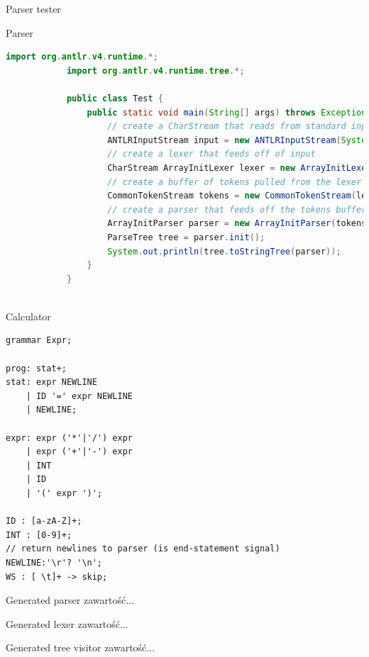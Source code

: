 \documentclass{beamer}
\begin{document}
\begin{frame}[fragile]{Parser tester}
	\begin{exampleblock}{Parser}
		\begin{lstlisting}[basicstyle=\tiny, language=Java]
			import org.antlr.v4.runtime.*;
			import org.antlr.v4.runtime.tree.*;
			
			public class Test { 
			    public static void main(String[] args) throws Exception { 
			        // create a CharStream that reads from standard input 
			        ANTLRInputStream input = new ANTLRInputStream(System.in);
			        // create a lexer that feeds off of input 
			        CharStream ArrayInitLexer lexer = new ArrayInitLexer(input);
			        // create a buffer of tokens pulled from the lexer 
			        CommonTokenStream tokens = new CommonTokenStream(lexer);
			        // create a parser that feeds off the tokens buffer 
			        ArrayInitParser parser = new ArrayInitParser(tokens);
			        ParseTree tree = parser.init();
			        System.out.println(tree.toStringTree(parser));
			    } 
			}
			
		\end{lstlisting}
	\end{exampleblock}
\end{frame}

\begin{frame}[fragile]{Calculator}
\begin{lstlisting}[style=ANTLR]
grammar Expr;

prog: stat+;
stat: expr NEWLINE
    | ID '=' expr NEWLINE
    | NEWLINE;

expr: expr ('*'|'/') expr
    | expr ('+'|'-') expr
    | INT
    | ID
    | '(' expr ')';

ID : [a-zA-Z]+;
INT : [0-9]+;
// return newlines to parser (is end-statement signal)
NEWLINE:'\r'? '\n';
WS : [ \t]+ -> skip;
\end{lstlisting}
\end{frame}

\begin{frame}{Generated parser}
	zawartość...
\end{frame}

\begin{frame}{Generated lexer}
	zawartość...
\end{frame}

\begin{frame}{Generated tree visitor}
	zawartość...
\end{frame}
\end{document}
